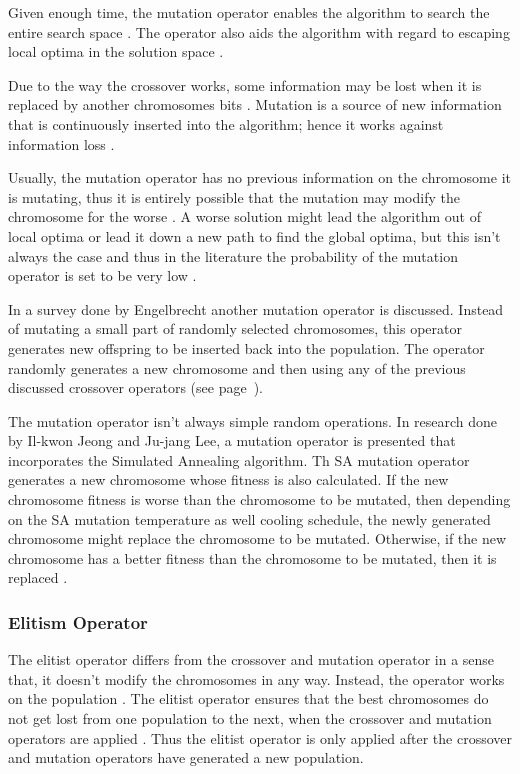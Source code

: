 Given enough time, the mutation operator enables the algorithm to search the entire search space \cite{FamilyGA}. The operator also aids the algorithm with regard to escaping local optima in the solution space \cite{FamilyGA}.

Due to the way the crossover works, some information may be lost when it is replaced by another chromosomes bits \cite{AcceleratingGA,ConstrainedGA}. Mutation is a source of new information that is continuously inserted into the algorithm; hence it works against information loss \cite{CoactiveFuzzyGA,AcceleratingGA,ConstrainedGA}. 

Usually, the mutation operator has no previous information on the chromosome it is mutating, thus it is entirely possible that the mutation may modify the chromosome for the worse \cite{AcceleratingGA}. A worse solution might lead the algorithm out of local optima or lead it down a new path to find the global optima, but this isn't always the case and thus in the literature the probability of the mutation operator is set to be very low \cite{AdaptiveSAGA,FamilyGA,ConstrainedGA}.

In a survey done by Engelbrecht\cite{CompuIntelligenceIntro} another mutation operator is discussed. Instead of mutating a small part of randomly selected chromosomes, this operator generates new offspring to be inserted back into the population. The operator randomly generates a new chromosome and then using any of the previous discussed crossover operators (see page~\pageref{sec:crossover}).

The mutation operator isn't always simple random operations. In research done by Il-kwon Jeong and Ju-jang Lee, a mutation operator is presented that incorporates the Simulated Annealing algorithm. Th SA mutation operator generates a new chromosome whose fitness is also calculated. If the new chromosome fitness is worse than the chromosome to be mutated, then depending on the SA mutation temperature as well cooling schedule, the newly generated chromosome might replace the chromosome to be mutated. Otherwise, if the new chromosome has a better fitness than the chromosome to be mutated, then it is replaced \cite{AdaptiveSAGA}.

\subsubsection{Elitism Operator}
The elitist operator differs from the crossover and mutation operator in a sense that, it doesn't modify the chromosomes in any way. Instead, the operator works on the population \cite{PatternDetectionGA}. The elitist operator ensures that the best chromosomes do not get lost from one population to the next, when the crossover and mutation operators are applied \cite{HetergeneousGA}. Thus the elitist operator is only applied after the crossover and mutation operators have generated a new population. 

